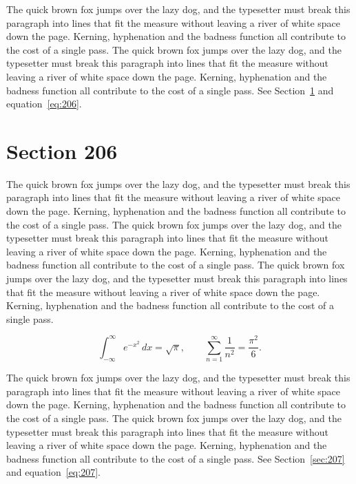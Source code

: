 \documentclass{article}
\begin{document}
The quick brown fox jumps over the lazy dog, and the typesetter must break this paragraph into lines that fit the measure without leaving a river of white space down the page. Kerning, hyphenation and the badness function all contribute to the cost of a single pass. The quick brown fox jumps over the lazy dog, and the typesetter must break this paragraph into lines that fit the measure without leaving a river of white space down the page. Kerning, hyphenation and the badness function all contribute to the cost of a single pass. 
See Section~\ref{sec:206} and equation~\eqref{eq:206}.
\section{Section 206}
\label{sec:206}
The quick brown fox jumps over the lazy dog, and the typesetter must break this paragraph into lines that fit the measure without leaving a river of white space down the page. Kerning, hyphenation and the badness function all contribute to the cost of a single pass. The quick brown fox jumps over the lazy dog, and the typesetter must break this paragraph into lines that fit the measure without leaving a river of white space down the page. Kerning, hyphenation and the badness function all contribute to the cost of a single pass. The quick brown fox jumps over the lazy dog, and the typesetter must break this paragraph into lines that fit the measure without leaving a river of white space down the page. Kerning, hyphenation and the badness function all contribute to the cost of a single pass. 

\begin{equation}\label{eq:206}
\int_{-\infty}^{\infty} e^{-x^{2}}\,dx = \sqrt{\pi}, \qquad
\sum_{n=1}^{\infty} \frac{1}{n^{2}} = \frac{\pi^{2}}{6}.
\end{equation}

The quick brown fox jumps over the lazy dog, and the typesetter must break this paragraph into lines that fit the measure without leaving a river of white space down the page. Kerning, hyphenation and the badness function all contribute to the cost of a single pass. The quick brown fox jumps over the lazy dog, and the typesetter must break this paragraph into lines that fit the measure without leaving a river of white space down the page. Kerning, hyphenation and the badness function all contribute to the cost of a single pass. 
See Section~\ref{sec:207} and equation~\eqref{eq:207}.
\end{document}
